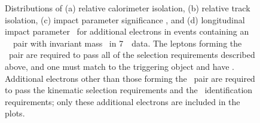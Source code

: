 \begin{figure}[h]
\centering
\caption[ Distributions of relative track and calorimeter isolation, \dzerosig\
and \zzero\ for additional electrons in events containing a dilepton pair with
mass \sstooos\ in 7~\tev\ data.]{Distributions of (a) relative calorimeter isolation, (b)
relative track isolation, (c) impact parameter significance \dzerosig,
and (d) longitudinal impact parameter \zzero\ for additional electrons in events
containing an \ossf\ \dilepton\ pair with
invariant mass \sstooos\ in 7~\tev\ data. The leptons forming the \dilepton\ pair are required to pass all of
the selection requirements described above, and one must match to the triggering
object and have \ptgt{25}. Additional electrons other than those forming the
\dilepton\ pair are required to pass
the kinematic selection requirements and the \loosePP\ identification
requirements; only these additional electrons are included in the plots.}
\label{fig:objsel-el}
\end{figure}


